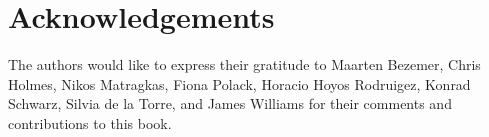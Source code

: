 \chapter*{Acknowledgements}
\label{sec:Acknowledgements}

The authors would like to express their gratitude to Maarten Bezemer, Chris Holmes, Nikos Matragkas, Fiona Polack, Horacio Hoyos Rodruigez, Konrad Schwarz, Silvia de la Torre, and James Williams for their comments and contributions to this book.